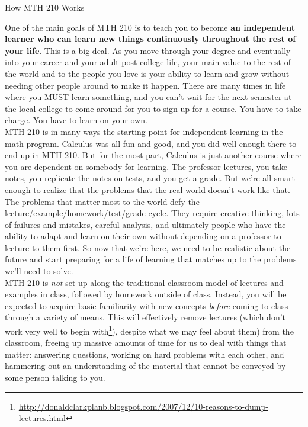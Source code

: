 \documentclass[11pt]{article}
\begin{document}
	
\begin{center}
	\begin{Large}
		How MTH 210 Works
	\end{Large}
\end{center}
	
	
	One of the main goals of MTH 210 is to teach you to become \textbf{an independent learner who can learn new things continuously throughout the rest of your life}. This is a big deal. As you move through your degree and eventually into your career and your adult post-college life, your main value to the rest of the world and to the people you love is your ability to learn and grow without needing other people around to make it happen. There are many times in life where you MUST learn something, and you can't wait for the next semester at the local college to come around for you to sign up for a course. You have to take charge. You have to learn on your own. \\

	MTH 210 is in many ways the starting point for independent learning in the math program. Calculus was all fun and good, and you did well enough there to end up in MTH 210. But for the most part, Calculus is just another course where you are dependent on somebody for learning. The professor lectures, you take notes, you replicate the notes on tests, and you get a grade. But we're all smart enough to realize that the problems that the real world doesn't work like that. The problems that matter most to the world defy the lecture/example/homework/test/grade cycle. They require creative thinking, lots of failures and mistakes, careful analysis, and ultimately people who have the ability to adapt and learn on their own without depending on a professor to lecture to them first. So now that we're here,  we need to be realistic about the future and start preparing for a life of learning that matches up to the problems we'll need to solve. \\ 

	MTH 210 is \emph{not} set up along the traditional classroom model of lectures and examples in class, followed by homework outside of class. Instead, you will be expected to acquire basic familiarity with new concepts \emph{before} coming to class through a variety of means. This will effectively remove lectures (which don't work very well to begin with\footnote{\url{http://donaldclarkplanb.blogspot.com/2007/12/10-reasons-to-dump-lectures.html}}), despite what we may feel about them) from the classroom, freeing up massive amounts of time for us to deal with things that matter: answering questions, working on hard problems with each other, and hammering out an understanding of the material that cannot be conveyed by some person talking to you. \\
\end{document}
